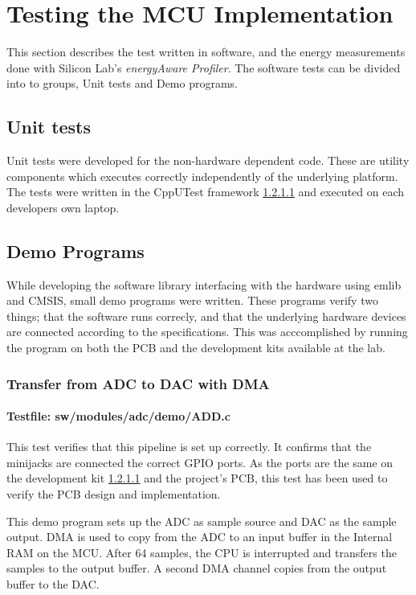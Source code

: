 \section{Testing the MCU Implementation}

This section describes the test written in software, and the energy measurements
done with Silicon Lab's \textit{energyAware Profiler}. The software tests can be
divided into to groups, Unit tests and Demo programs.

\subsection{Unit tests}

Unit tests were developed for the non-hardware dependent code. These are
utility components which executes correctly independently of the underlying
platform. The tests were written in the CppUTest framework \ref{} and executed
on each developers own laptop.

\subsection{Demo Programs}

While developing the software library interfacing with the hardware using emlib
and CMSIS, small demo programs were written. These programs verify two things;
that the software runs correcly, and that the underlying hardware devices are
connected according to the specifications. This was acccomplished by running the
program on both the PCB and the development kits available at the lab.

\subsubsection{Transfer from ADC to DAC with DMA}
\paragraph{Testfile: sw/modules/adc/demo/ADD.c}

This test verifies that this pipeline is set up correctly. It confirms that the
minijacks are connected the correct GPIO ports. As the ports are the same on the
development kit \ref{} and the project's PCB, this test has been used to verify
the PCB design and implementation.

This demo program sets up the ADC as sample source and DAC as the sample output.
DMA is used to copy from the ADC to an input buffer in the Internal RAM on the
MCU. After 64 samples, the CPU is interrupted and transfers the samples to the
output buffer. A second DMA channel copies from the output buffer to the DAC.

